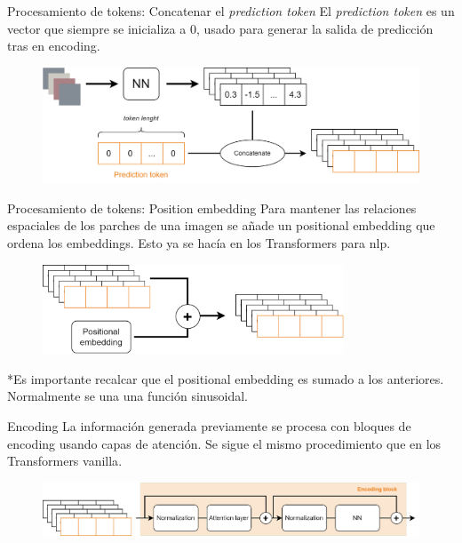 \begin{frame}{Procesamiento de tokens: Concatenar el \textit{prediction token}}
El \alert{\textit{prediction token}} es un vector que siempre se inicializa a \alert{0}, usado para generar la salida de \alert{predicción tras en encoding}.

\begin{figure}
    \centering
    \includegraphics[width=\textwidth]{Slides/figures/Vision_Transformers/Pred_Token.png}
\end{figure}
\end{frame}

\begin{frame}{Procesamiento de tokens: Position embedding}
Para mantener las \alert{relaciones espaciales} de los parches de una imagen se añade un \alert{positional embedding} que \alert{ordena} los embeddings. Esto ya se hacía en los \alert{Transformers} para \gls{nlp}.

\begin{figure}
    \centering
    \includegraphics[width=0.8\textwidth]{Slides/figures/Vision_Transformers/Pos_Embedding.png}
\end{figure}

*Es importante recalcar que el positional embedding es \alert{sumado} a los anteriores. Normalmente se una una función \alert{sinusoidal}.
\end{frame}

\begin{frame}{Encoding}
La información generada previamente se procesa con \alert{bloques de encoding} usando capas de \alert{atención}. Se sigue el mismo procedimiento que en los \alert{Transformers vanilla}. 

\begin{figure}
    \centering
    \includegraphics[width=\textwidth]{Slides/figures/Vision_Transformers/Encoding_Block.png}
\end{figure}
\end{frame}

